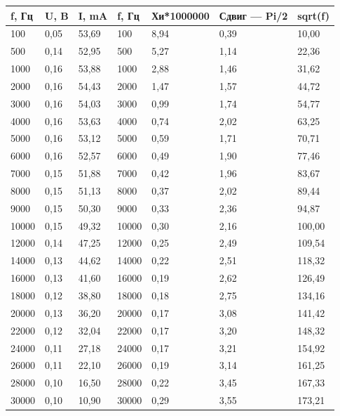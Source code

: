 \documentclass[a4paper]{article}
\begin{document}
\begin{tabular}{|l|l|l|l|l|l|l|} \hline
f, Гц & U, B  & I, mA  & f, Гц & Хи*1000000 & Сдвиг — Pi/2 & sqrt(f) \\ \hline
100   & 0,05         & 53,69       & 100   & 8,94       & 0,39         & 10,00   \\ \hline
500   & 0,14         & 52,95       & 500   & 5,27       & 1,14         & 22,36   \\ \hline
1000  & 0,16         & 53,88       & 1000  & 2,88       & 1,46         & 31,62   \\ \hline
2000  & 0,16         & 54,43       & 2000  & 1,47       & 1,57         & 44,72   \\ \hline
3000  & 0,16         & 54,03       & 3000  & 0,99       & 1,74         & 54,77   \\ \hline
4000  & 0,16         & 53,63       & 4000  & 0,74       & 2,02         & 63,25   \\ \hline 
5000  & 0,16         & 53,12       & 5000  & 0,59       & 1,71         & 70,71   \\ \hline
6000  & 0,16         & 52,57       & 6000  & 0,49       & 1,90         & 77,46   \\ \hline
7000  & 0,15         & 51,88       & 7000  & 0,42       & 1,96         & 83,67   \\ \hline
8000  & 0,15         & 51,13       & 8000  & 0,37       & 2,02         & 89,44   \\ \hline 
9000  & 0,15         & 50,30       & 9000  & 0,33       & 2,36         & 94,87   \\ \hline
10000 & 0,15         & 49,32       & 10000 & 0,30       & 2,16         & 100,00  \\ \hline
12000 & 0,14         & 47,25       & 12000 & 0,25       & 2,49         & 109,54  \\ \hline 
14000 & 0,13         & 44,62       & 14000 & 0,22       & 2,51         & 118,32  \\ \hline
16000 & 0,13         & 41,60       & 16000 & 0,19       & 2,62         & 126,49  \\ \hline
18000 & 0,12         & 38,80       & 18000 & 0,18       & 2,75         & 134,16  \\ \hline
20000 & 0,13         & 36,20       & 20000 & 0,17       & 3,08         & 141,42  \\ \hline
22000 & 0,12         & 32,04       & 22000 & 0,17       & 3,20         & 148,32  \\ \hline
24000 & 0,11         & 27,18       & 24000 & 0,17       & 3,21         & 154,92  \\ \hline
26000 & 0,11         & 22,10       & 26000 & 0,19       & 3,14         & 161,25  \\ \hline
28000 & 0,10         & 16,50       & 28000 & 0,22       & 3,45         & 167,33  \\ \hline
30000 & 0,10         & 10,90       & 30000 & 0,29       & 3,55         & 173,21 \\ \hline
\end{tabular}
\end{document}
